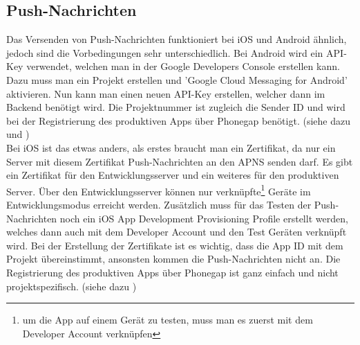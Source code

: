 \subsection{Push-Nachrichten}
Das Versenden von Push-Nachrichten funktioniert bei iOS und Android ähnlich, jedoch sind die Vorbedingungen sehr unterschiedlich. Bei Android wird ein API-Key verwendet, welchen man in der Google Developers Console erstellen kann. Dazu muss man ein Projekt erstellen und 'Google Cloud Messaging for Android' aktivieren. Nun kann man einen neuen API-Key erstellen, welcher dann im Backend benötigt wird. Die Projektnummer ist zugleich die Sender ID und wird bei der Registrierung des produktiven Apps über Phonegap benötigt. (siehe dazu \cite{android_push_android} und \cite{devgirl_push_android})\\


Bei iOS ist das etwas anders, als erstes braucht man ein Zertifikat, da nur ein Server mit diesem Zertifikat Push-Nachrichten an den APNS senden darf. Es gibt ein Zertifikat für den Entwicklungsserver und ein weiteres für den produktiven Server. Über den Entwicklungsserver können nur verknüpfte\footnote{um die App auf einem Gerät zu testen, muss man es zuerst mit dem Developer Account verknüpfen} Geräte im Entwicklungsmodus erreicht werden. Zusätzlich muss für das Testen der Push-Nachrichten noch ein iOS App Development Provisioning Profile erstellt werden, welches dann auch mit dem Developer Account und den Test Geräten verknüpft wird. Bei der Erstellung der Zertifikate ist es wichtig, dass die App ID mit dem Projekt übereinstimmt, ansonsten kommen die Push-Nachrichten nicht an. Die Registrierung des produktiven Apps über Phonegap ist ganz einfach und nicht projektspezifisch. (siehe dazu \cite{ios_push})\\

